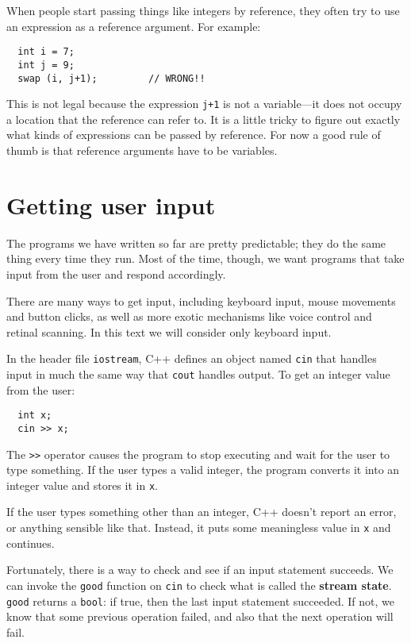 When people start passing things like integers by reference,
they often try to use an expression
as a reference argument.  For example:

\begin{verbatim}
  int i = 7;
  int j = 9;
  swap (i, j+1);         // WRONG!!
\end{verbatim}
%
This is not legal because the expression {\tt j+1} is not
a variable---it does not occupy a location that the reference
can refer to.  It is a little tricky to figure out exactly
what kinds of expressions can be passed by reference.  For now
a good rule of thumb is that reference arguments have to be
variables.

\section{Getting user input}
\label{input}

The programs we have written so far are pretty predictable;
they do the same thing every time they run.  Most of the time,
though, we want programs that take input from the user and
respond accordingly.

There are many ways to get input, including keyboard
input, mouse movements and button clicks, as well as more exotic
mechanisms like voice control and retinal scanning.  In this
text we will consider only keyboard input.


In the header file {\tt iostream},
C++ defines an object named {\tt cin} that handles input in
much the same way that {\tt cout} handles output.  To get an
integer value from the user:

\begin{verbatim}
  int x;
  cin >> x;
\end{verbatim}
%
The {\tt >>} operator causes the program to stop executing and
wait for the user to type something.  If the user types a valid
integer, the program converts it into an integer value and
stores it in {\tt x}.


If the user types something other than an integer,
C++ doesn't report an error, or anything sensible like that.
Instead, it puts some meaningless value in {\tt x} and continues.

Fortunately, there is a way to check and see if an input
statement succeeds.  We can invoke the {\tt good} function on
{\tt cin} to check what is called the {\bf stream state}.
{\tt good} returns a {\tt bool}: if true, then the last input
statement succeeded.  If not, we know that some previous operation
failed, and also that the next operation will fail.


